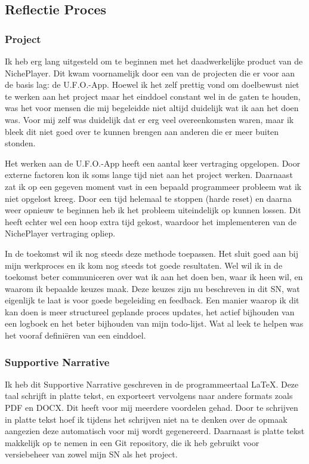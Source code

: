 \subsection{Reflectie Proces}

\subsubsection*{Project}
Ik heb erg lang uitgesteld om te beginnen met het daadwerkelijke product van de NichePlayer. Dit kwam voornamelijk door een van de projecten die er voor aan de basis lag: de U.F.O.-App. Hoewel ik het zelf prettig vond om doelbewust niet te werken aan het project maar het einddoel constant wel in de gaten te houden, was het voor mensen die mij begeleidde niet altijd duidelijk wat ik aan het doen was. Voor mij zelf was duidelijk dat er erg veel overeenkomsten waren, maar ik bleek dit niet goed over te kunnen brengen aan anderen die er meer buiten stonden.

Het werken aan de U.F.O.-App heeft een aantal keer vertraging opgelopen. Door externe factoren kon ik soms lange tijd niet aan het project werken. Daarnaast zat ik op een gegeven moment vast in een bepaald programmeer probleem wat ik niet opgelost kreeg. Door een tijd helemaal te stoppen (harde reset) en daarna weer opnieuw te beginnen heb ik het probleem uiteindelijk op kunnen lossen. Dit heeft echter wel een hoop extra tijd gekost, waardoor het implementeren van de NichePlayer vertraging opliep.

In de toekomst wil ik nog steeds deze methode toepassen. Het sluit goed aan bij mijn werkproces en ik kom nog steeds tot goede resultaten. Wel wil ik in de toekomst beter communiceren over wat ik aan het doen ben, waar ik heen wil, en waarom ik bepaalde keuzes maak. Deze keuzes zijn nu beschreven in dit SN, wat eigenlijk te laat is voor goede begeleiding en feedback. Een manier waarop ik dit kan doen is meer structureel geplande proces updates, het actief bijhouden van een logboek en het beter bijhouden van mijn todo-lijst. Wat al leek te helpen was het vooraf definiëren van een einddoel.

\subsubsection*{Supportive Narrative}
Ik heb dit Supportive Narrative geschreven in de programmeertaal LaTeX. Deze taal schrijft in platte tekst, en exporteert vervolgens naar andere formats zoals PDF en DOCX. Dit heeft voor mij meerdere voordelen gehad. Door te schrijven in platte tekst hoef ik tijdens het schrijven niet na te denken over de opmaak aangezien deze automatisch voor mij wordt gegenereerd. Daarnaast is platte tekst makkelijk op te nemen in een Git repository, die ik heb gebruikt voor versiebeheer van zowel mijn SN als het project.

